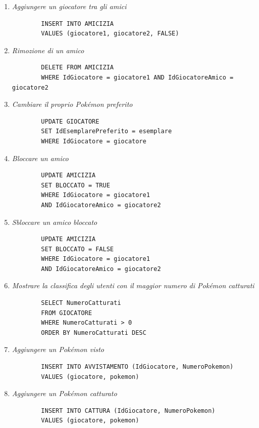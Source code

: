 \documentclass[a4paper,12pt]{report}
\begin{document}
\begin{enumerate}
	\item \textit{Aggiungere un giocatore tra gli amici}
	\begin{verbatim}
		INSERT INTO AMICIZIA
		VALUES (giocatore1, giocatore2, FALSE)
	\end{verbatim}
	
	\item \textit{Rimozione di un amico}
	\begin{verbatim}
		DELETE FROM AMICIZIA
		WHERE IdGiocatore = giocatore1 AND IdGiocatoreAmico = giocatore2
	\end{verbatim}
	
	\item \textit{Cambiare il proprio Pokémon preferito}
	\begin{verbatim}
		UPDATE GIOCATORE
		SET IdEsemplarePreferito = esemplare
		WHERE IdGiocatore = giocatore
	\end{verbatim}
	
	\item \textit{Bloccare un amico}
	\begin{verbatim}
		UPDATE AMICIZIA
		SET BLOCCATO = TRUE
		WHERE IdGiocatore = giocatore1
		AND IdGiocatoreAmico = giocatore2
	\end{verbatim}
	
	\item \textit{Sbloccare un amico bloccato}
	\begin{verbatim}
		UPDATE AMICIZIA
		SET BLOCCATO = FALSE
		WHERE IdGiocatore = giocatore1
		AND IdGiocatoreAmico = giocatore2
	\end{verbatim}
	
	\item \textit{Mostrare la classifica degli utenti con il maggior numero di Pokémon catturati}
	\begin{verbatim}
		SELECT NumeroCatturati
		FROM GIOCATORE
		WHERE NumeroCatturati > 0
		ORDER BY NumeroCatturati DESC
	\end{verbatim}
	
	\item \textit{Aggiungere un Pokémon visto}
	\begin{verbatim}
		INSERT INTO AVVISTAMENTO (IdGiocatore, NumeroPokemon)
		VALUES (giocatore, pokemon)
	\end{verbatim}
	
	\item \textit{Aggiungere un Pokémon catturato}
	\begin{verbatim}
		INSERT INTO CATTURA (IdGiocatore, NumeroPokemon)
		VALUES (giocatore, pokemon)
	\end{verbatim}
	

\end{enumerate}
\end{document}
